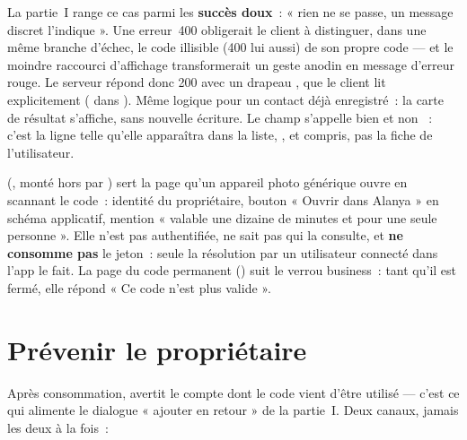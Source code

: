 \begin{alerte}
La partie~I range ce cas parmi les \textbf{succès doux}~: « rien ne se passe, un message
discret l'indique ». Une erreur~400 obligerait le client à distinguer, dans une même
branche d'échec, le code illisible (400 lui aussi) de son propre code --- et le moindre
raccourci d'affichage transformerait un geste anodin en message d'erreur rouge. Le
serveur répond donc 200 avec un drapeau , que le client lit explicitement
( dans ). Même logique pour un contact déjà
enregistré~: la carte de résultat s'affiche, sans nouvelle écriture. Le champ s'appelle
bien  et non ~: c'est la ligne  telle
qu'elle apparaîtra dans la liste, ,  et
 compris, pas la fiche de l'utilisateur.
\end{alerte}

\begin{note}
 (, monté
hors  par ) sert la page qu'un
appareil photo générique ouvre en scannant le code~: identité du propriétaire, bouton
« Ouvrir dans Alanya » en schéma applicatif, mention « valable une dizaine de minutes et
pour une seule personne ». Elle n'est pas authentifiée, ne sait pas qui la consulte, et
\textbf{ne consomme pas} le jeton~: seule la résolution par un utilisateur connecté dans
l'app le fait. La page du code permanent () suit le verrou
business~: tant qu'il est fermé, elle répond « Ce code n'est plus valide ».
\end{note}

\section{Prévenir le propriétaire}
\label{sec:qr-prevenir}

Après consommation,  avertit le compte dont le code vient
d'être utilisé --- c'est ce qui alimente le dialogue « ajouter en retour » de la
partie~I. Deux canaux, jamais les deux à la fois~:

